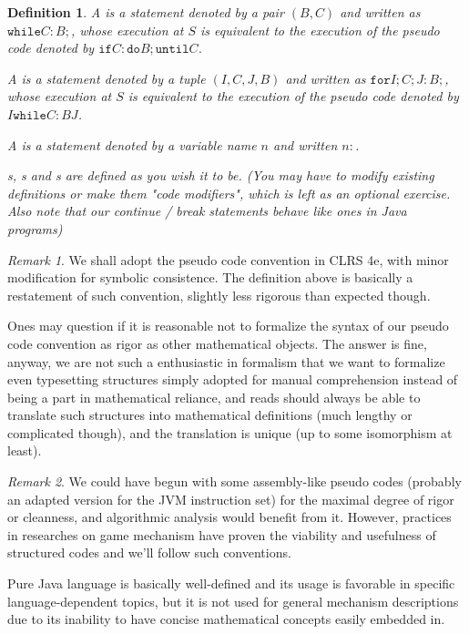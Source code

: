 \documentclass{book}
\newtheorem{definition}{Definition}
\theoremstyle{definition}\newtheorem{mechanism}{Mechanism}
\theoremstyle{remark}\newtheorem*{remark}{Remark}
\begin{document}
\begin{definition}
	A  is a statement denoted by a pair $(B, C)$ and written as $\mathtt{while} C: B;$, whose execution at $S$ is equivalent to the execution of the pseudo code denoted by $\mathtt{if} C:\mathtt{do}B;\mathtt{until} C$.
	
	A  is a statement denoted by a tuple $(I, C, J, B)$ and written as $\mathtt{for} I; C; J: B;$, whose execution at $S$ is equivalent to the execution of the pseudo code denoted by $I\mathtt{while} C: BJ$.
	
	A  is a statement denoted by a variable name $n$ and written $n:$.
	
	s, s and s are defined as you wish it to be. (You may have to modify existing definitions or make them "code modifiers", which is left as an optional exercise. Also note that our continue / break statements behave like ones in Java programs)
\end{definition}

\begin{remark}
	We shall adopt the pseudo code convention in CLRS 4e, with minor modification for symbolic consistence. The definition above is basically a restatement of such convention, slightly less rigorous than expected though.
	
	Ones may question if it is reasonable not to formalize the syntax of our pseudo code convention as rigor as other mathematical objects. The answer is fine, anyway, we are not such a enthusiastic in formalism that we want to formalize even typesetting structures simply adopted for manual comprehension instead of being a part in mathematical reliance, and reads should always be able to translate such structures into mathematical definitions (much lengthy or complicated though), and the translation is unique (up to some isomorphism at least).
\end{remark}

\begin{remark}
	We could have begun with some assembly-like pseudo codes (probably an adapted version for the JVM instruction set) for the maximal degree of rigor or cleanness, and algorithmic analysis would benefit from it. However, practices in researches on game mechanism have proven the viability and usefulness of structured codes and we'll follow such conventions. 
	
	Pure Java language is basically well-defined and its usage is favorable in specific language-dependent topics, but it is not used for general mechanism descriptions due to its inability to have concise mathematical concepts easily embedded in.
\end{remark}
\end{document}

